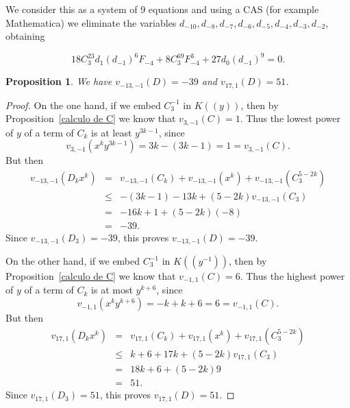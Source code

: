 \documentclass[reqno,a4paper,twoside]{amsart}
\newtheorem{proposition}[theorem]{Proposition}
\theoremstyle{definition}
\theoremstyle{remark}
\begin{document}
We consider this as a system of 9 equations and using a CAS (for example Mathematica) we eliminate the variables $d_{-10}, d_{-8}, d_{-7}, d_{-6}, d_{-5}, d_{-4}, d_{-3}, d_{-2}$, obtaining

\begin{equation}\label{ecuacion principal}
  18 C_3^{23} d_1 (d_{-1})^6 F_{-4} + 8 C_3^{69} F_{-4}^3 + 27 d_0 (d_{-1})^9=0.
\end{equation}

\begin{proposition}
  We have $v_{-13,-1}(D)=-39$ and $v_{17,1}(D)=51$.
\end{proposition}

\begin{proof}
On the one hand, if we embed $C_3^{-1}$ in $K((y))$, then by Proposition~\ref{calculo de C} we know that $v_{3,-1}(C)=1$.  Thus the lowest power of $y$ of a term of
$C_k$ is at least $y^{3k-1}$, since
$$
v_{3,-1}(x^k y^{3k-1})=3k-(3k-1)=1=v_{3,-1}(C).
$$
But then
\begin{eqnarray*}
v_{-13,-1}(D_k x^k) &=& v_{-13,-1}(C_k)+v_{-13,-1}(x^k)+v_{-13,-1}(C_3^{5-2k}) \\
   &\le & -(3k-1)-13k+(5-2k)v_{-13,-1}(C_3)\\
   &=& -16k+1+(5-2k)(-8)\\
   &=& -39.
\end{eqnarray*}
Since $v_{-13,-1}(D_3)=-39$, this proves $v_{-13,-1}(D)=-39$.

On the other hand, if we embed $C_3^{-1}$ in $K((y^{-1}))$, then by Proposition~\ref{calculo de C} we know that $v_{-1,1}(C)=6$. Thus the highest power of $y$ of a term of
$C_k$ is at most $y^{k+6}$, since
$$
v_{-1,1}(x^k y^{k+6})=-k+k+6=6=v_{-1,1}(C).
$$
But then
\begin{eqnarray*}
v_{17,1}(D_k x^k) &=& v_{17,1}(C_k)+v_{17,1}(x^k)+v_{17,1}(C_3^{5-2k}) \\
   &\le & k+6 +17k+(5-2k)v_{17,1}(C_3)\\
   &=& 18k+6+(5-2k)9\\
   &=& 51.
\end{eqnarray*}
Since $v_{17,1}(D_3)=51$, this proves $v_{17,1}(D)=51$.
\end{proof}
\end{document}
